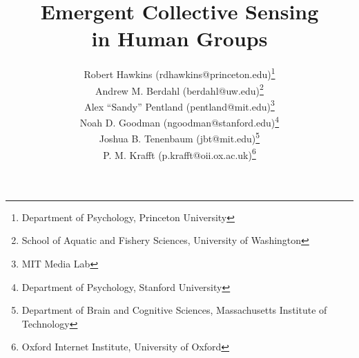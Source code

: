 \documentclass[12pt,letterpaper]{article}
\title{Emergent Collective Sensing\\ in Human Groups}
\author{
Robert Hawkins (rdhawkins@princeton.edu)\thanks{Department of Psychology, Princeton University}\\
Andrew M. Berdahl (berdahl@uw.edu)\thanks{School of Aquatic and Fishery Sciences, University of Washington}\\
Alex ``Sandy'' Pentland (pentland@mit.edu)\thanks{MIT Media Lab}\\
Noah D. Goodman (ngoodman@stanford.edu)\thanks{Department of Psychology, Stanford University}\\
Joshua B. Tenenbaum (jbt@mit.edu)\thanks{Department of Brain and Cognitive Sciences, Massachusetts Institute of Technology}\\
P. M. Krafft (p.krafft@oii.ox.ac.uk)\thanks{Oxford Internet Institute, University of Oxford}
}
\date{}
\begin{document}
\maketitle
\vspace{-2em}

\begin{abstract}














\end{abstract}
\end{document}
